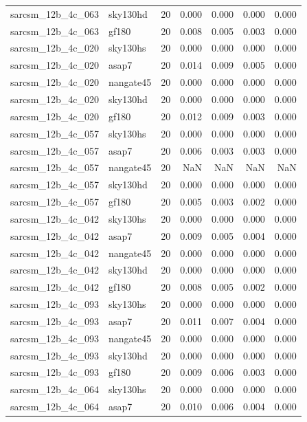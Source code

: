 \begin{tabular}{llrrrrr}
sarcsm\_12b\_4c\_063 & sky130hd & 20 & 0.000 & 0.000 & 0.000 & 0.000 \\
sarcsm\_12b\_4c\_063 & gf180 & 20 & 0.008 & 0.005 & 0.003 & 0.000 \\
sarcsm\_12b\_4c\_020 & sky130hs & 20 & 0.000 & 0.000 & 0.000 & 0.000 \\
sarcsm\_12b\_4c\_020 & asap7 & 20 & 0.014 & 0.009 & 0.005 & 0.000 \\
sarcsm\_12b\_4c\_020 & nangate45 & 20 & 0.000 & 0.000 & 0.000 & 0.000 \\
sarcsm\_12b\_4c\_020 & sky130hd & 20 & 0.000 & 0.000 & 0.000 & 0.000 \\
sarcsm\_12b\_4c\_020 & gf180 & 20 & 0.012 & 0.009 & 0.003 & 0.000 \\
sarcsm\_12b\_4c\_057 & sky130hs & 20 & 0.000 & 0.000 & 0.000 & 0.000 \\
sarcsm\_12b\_4c\_057 & asap7 & 20 & 0.006 & 0.003 & 0.003 & 0.000 \\
sarcsm\_12b\_4c\_057 & nangate45 & 20 & NaN & NaN & NaN & NaN \\
sarcsm\_12b\_4c\_057 & sky130hd & 20 & 0.000 & 0.000 & 0.000 & 0.000 \\
sarcsm\_12b\_4c\_057 & gf180 & 20 & 0.005 & 0.003 & 0.002 & 0.000 \\
sarcsm\_12b\_4c\_042 & sky130hs & 20 & 0.000 & 0.000 & 0.000 & 0.000 \\
sarcsm\_12b\_4c\_042 & asap7 & 20 & 0.009 & 0.005 & 0.004 & 0.000 \\
sarcsm\_12b\_4c\_042 & nangate45 & 20 & 0.000 & 0.000 & 0.000 & 0.000 \\
sarcsm\_12b\_4c\_042 & sky130hd & 20 & 0.000 & 0.000 & 0.000 & 0.000 \\
sarcsm\_12b\_4c\_042 & gf180 & 20 & 0.008 & 0.005 & 0.002 & 0.000 \\
sarcsm\_12b\_4c\_093 & sky130hs & 20 & 0.000 & 0.000 & 0.000 & 0.000 \\
sarcsm\_12b\_4c\_093 & asap7 & 20 & 0.011 & 0.007 & 0.004 & 0.000 \\
sarcsm\_12b\_4c\_093 & nangate45 & 20 & 0.000 & 0.000 & 0.000 & 0.000 \\
sarcsm\_12b\_4c\_093 & sky130hd & 20 & 0.000 & 0.000 & 0.000 & 0.000 \\
sarcsm\_12b\_4c\_093 & gf180 & 20 & 0.009 & 0.006 & 0.003 & 0.000 \\
sarcsm\_12b\_4c\_064 & sky130hs & 20 & 0.000 & 0.000 & 0.000 & 0.000 \\
sarcsm\_12b\_4c\_064 & asap7 & 20 & 0.010 & 0.006 & 0.004 & 0.000 \\

\end{tabular}
